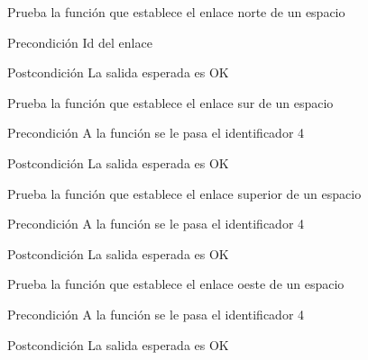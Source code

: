 \begin{DoxyRefList}
\item[\label{test__test000253}%
\hypertarget{test__test000253}{}%
Global \hyperlink{space__test_8c_a3d3457a89f705948102cf1e5d4a7b45b}{test1\-\_\-space\-\_\-set\-\_\-north} ()]Prueba la función que establece el enlace norte de un espacio \begin{DoxyPrecond}{Precondición}
Id del enlace 
\end{DoxyPrecond}
\begin{DoxyPostcond}{Postcondición}
La salida esperada es O\-K  
\end{DoxyPostcond}

\item[\label{test__test000256}%
\hypertarget{test__test000256}{}%
Global \hyperlink{space__test_8c_a21938e16547b3080e9251f960117a859}{test1\-\_\-space\-\_\-set\-\_\-south} ()]Prueba la función que establece el enlace sur de un espacio \begin{DoxyPrecond}{Precondición}
A la función se le pasa el identificador 4 
\end{DoxyPrecond}
\begin{DoxyPostcond}{Postcondición}
La salida esperada es O\-K  
\end{DoxyPostcond}

\item[\label{test__test000265}%
\hypertarget{test__test000265}{}%
Global \hyperlink{space__test_8c_a087e9efe152864bbb919b3d4208f66b7}{test1\-\_\-space\-\_\-set\-\_\-up} ()]Prueba la función que establece el enlace superior de un espacio \begin{DoxyPrecond}{Precondición}
A la función se le pasa el identificador 4 
\end{DoxyPrecond}
\begin{DoxyPostcond}{Postcondición}
La salida esperada es O\-K  
\end{DoxyPostcond}

\item[\label{test__test000262}%
\hypertarget{test__test000262}{}%
Global \hyperlink{space__test_8c_ab680a8797f793dffd58546074b87d21f}{test1\-\_\-space\-\_\-set\-\_\-west} ()]Prueba la función que establece el enlace oeste de un espacio \begin{DoxyPrecond}{Precondición}
A la función se le pasa el identificador 4 
\end{DoxyPrecond}
\begin{DoxyPostcond}{Postcondición}
La salida esperada es O\-K  
\end{DoxyPostcond}


\end{DoxyRefList}
